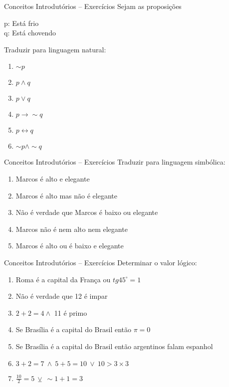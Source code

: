 \begin{frame}[t]{Conceitos Introdutórios -- Exercícios} %
	Sejam as proposições 

	\begin{center}
	p: Está frio\\
	q: Está chovendo
	\end{center} 

	Traduzir para linguagem natural:

	\begin{enumerate}
	  \item $\sim p$
	  \item $p \wedge q$
	  \item $p \vee q$
	  \item $p \rightarrow \sim q$
	  \item $p \leftrightarrow q$
	  \item $\sim p \wedge \sim q$
	\end{enumerate}
\end{frame}

\begin{frame}[t]{Conceitos Introdutórios -- Exercícios} %
	Traduzir para linguagem simbólica:

	\begin{enumerate}
	  \item Marcos é alto e elegante
	  \item Marcos é alto mas não é elegante
	  \item Não é verdade que Marcos é baixo ou elegante
	  \item Marcos não é nem alto nem elegante
	  \item Marcos é alto ou é baixo e elegante
	\end{enumerate}
\end{frame}

\begin{frame}[t]{Conceitos Introdutórios -- Exercícios} %
	Determinar o valor lógico:

	\begin{enumerate}
	  \item Roma é a capital da França ou $tg 45^\circ = 1$
	  \item Não é verdade que 12 é impar
	  \item $2+2=4 \wedge$ 11 é primo
	  \item Se Brasília é a capital do Brasil então $\pi = 0$
	  \item Se Brasília é a capital do Brasil então argentinos falam espanhol
	  \item $3 + 2 = 7 ~\wedge~ 5 + 5 = 10 ~\vee~ 10 > 3 \times 3$
	  \item $\frac{10}{2} = 5  ~ \veebar ~  \sim 1 + 1 = 3$
	\end{enumerate}
\end{frame}
